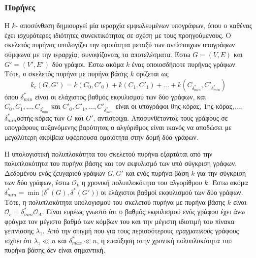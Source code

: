 \subsubsection{ Πυρήνες}
Η $k$- αποσύνθεση δημιουργεί μία ιεραρχία εμφωλευμένων υπογράφων, όπου ο καθένας έχει ισχυρότερες ιδιότητες συνεκτικότητας σε σχέση με τους προηγούμενους.
Ο  σκελετός πυρήνας υπολογίζει την ομοιότητα μεταξύ των αντίστοιχων υπογράφων σύμφωνα με την  ιεραρχία,  συνοψίζοντας τα αποτελέσματα.
Έστω $G=(V,E)$ και $G'=(V',E')$ δύο γράφοι.
Έστω ακόμα $k$ ένας οποιοσδήποτε πυρήνας γράφων.
Τότε, ο σκελετός πυρήνα  με πυρήνα βάσης $k$ ορίζεται ως
\begin{equation}
  k_c(G, G') = k(C_0,C'_0) + k(C_1,C'_1) + \ldots + k(C_{\delta^*_{min}},C'_{\delta^*_{min}}) 
\end{equation}
όπου $\delta^*_{min}$ είναι οι ελάχιστος βαθμός εκφυλισμού των δύο γράφων, και $C_0,C_1,\ldots,C_{\delta^*_{min}}$ και $C'_0,C'_1,\ldots,C'_{\delta^*_{min}}$ είναι οι υπογράφοι $0$ης-κόρας, $1$ης-κόρας,$\ldots$, $\delta^*_{min}$οστής-κόρας των $G$ και $G'$, αντίστοιχα.
Αποσυνθέτοντας τους γράφους σε υπογράφους αυξανόμενης βαρύτητας ο αλγόριθμος είναι ικανός να αποδώσει με μεγαλύτερη ακρίβεια υφέρπουσα ομοιότητα στην δομή δύο γράφων.\par
Η υπολογιστική πολυπλοκότητα του σκελετού πυρήνα  εξαρτάται από την πολυπλοκότητα του πυρήνα βάσης και τον εκφυλισμό των υπό σύγκριση γράφων.
Δεδομένου ενός ζευγαριού γράφων $G, G'$ και ενός πυρήνα βάση $k$ για την σύγκριση των δύο γράφων, έστω $\mathcal{O}_k$ η χρονική πολυπλοκότητα του αλγορίθμου $k$.
Έστω ακόμα $\delta^*_{min} = \min \big( \delta^*(G),\delta^*(G') \big)$ οι ελάχιστοι βαθμοί εκφυλισμού των δύο γράφων.
Τότε, η πολυπλοκότητα υπολογισμού του σκελετού πυρήνα  με πυρήνα βάσης $k$ είναι $\mathcal{O}_{c}=\delta^*_{min}\mathcal{O}_A$.
Είναι ευρέως γνωστό ότι ο βαθμός εκφυλισμού ενός γράφου έχει άνω φράγμα τον μέγιστο βαθμό των κόμβων του και την μέγιστη ιδιοτιμή του πίνακα γειτνίασης $\lambda_1$.
Από την στιγμή που για τους περισσότερους \textit{πραγματικούς} γράφους ισχύει ότι $\lambda_1 \ll n$ και $\delta^*_{max} \ll n$, η επαύξηση στην χρονική πολυπλοκότητα του πυρήνα βάσης δεν είναι σημαντική.

